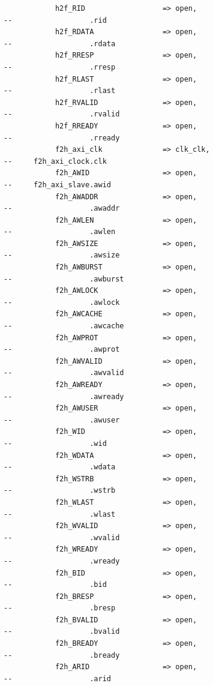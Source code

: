 \documentclass[conference]{IEEEtran}
\begin{document}
\begin{lstlisting}
			h2f_RID                  => open,                            --                  .rid
			h2f_RDATA                => open,                            --                  .rdata
			h2f_RRESP                => open,                            --                  .rresp
			h2f_RLAST                => open,                            --                  .rlast
			h2f_RVALID               => open,                            --                  .rvalid
			h2f_RREADY               => open,                            --                  .rready
			f2h_axi_clk              => clk_clk,                         --     f2h_axi_clock.clk
			f2h_AWID                 => open,                            --     f2h_axi_slave.awid
			f2h_AWADDR               => open,                            --                  .awaddr
			f2h_AWLEN                => open,                            --                  .awlen
			f2h_AWSIZE               => open,                            --                  .awsize
			f2h_AWBURST              => open,                            --                  .awburst
			f2h_AWLOCK               => open,                            --                  .awlock
			f2h_AWCACHE              => open,                            --                  .awcache
			f2h_AWPROT               => open,                            --                  .awprot
			f2h_AWVALID              => open,                            --                  .awvalid
			f2h_AWREADY              => open,                            --                  .awready
			f2h_AWUSER               => open,                            --                  .awuser
			f2h_WID                  => open,                            --                  .wid
			f2h_WDATA                => open,                            --                  .wdata
			f2h_WSTRB                => open,                            --                  .wstrb
			f2h_WLAST                => open,                            --                  .wlast
			f2h_WVALID               => open,                            --                  .wvalid
			f2h_WREADY               => open,                            --                  .wready
			f2h_BID                  => open,                            --                  .bid
			f2h_BRESP                => open,                            --                  .bresp
			f2h_BVALID               => open,                            --                  .bvalid
			f2h_BREADY               => open,                            --                  .bready
			f2h_ARID                 => open,                            --                  .arid

\end{lstlisting}
\end{document}
